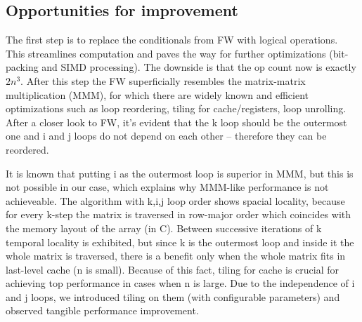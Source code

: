 \documentclass[letterpaper]{article}
\begin{document}
\subsection{Opportunities for improvement}
The first step is to replace the conditionals from FW with logical operations. 
This streamlines computation and paves the way for further optimizations 
(bit-packing and SIMD processing). The downside is that the op count now is exactly \(2n^3\). 
After this step the FW superficially resembles the matrix-matrix multiplication (MMM), 
for which there are widely known and efficient optimizations such as loop reordering, 
tiling for cache/registers, loop unrolling. After a closer look to FW, it's evident 
that the k loop should be the outermost one and i and j loops do not depend on each 
other -- therefore they can be reordered.

It is known that putting i as the outermost loop is superior in MMM, but this is 
not possible in our case, which explains why MMM-like performance is not achieveable. 
The algorithm with k,i,j loop order shows spacial locality, because for every k-step the matrix is traversed 
in row-major order which coincides with the memory layout of the array (in C).
Between successive iterations of k temporal locality is exhibited, but since k is the outermost loop and 
inside it the whole matrix is traversed, there is a benefit only when the whole matrix fits in last-level cache (n is small). Because of 
this fact, tiling for cache is crucial for achieving top performance in cases 
when n is large. Due to the independence of i and j loops, we introduced 
tiling on them (with configurable parameters) and observed tangible performance improvement.
\end{document}
